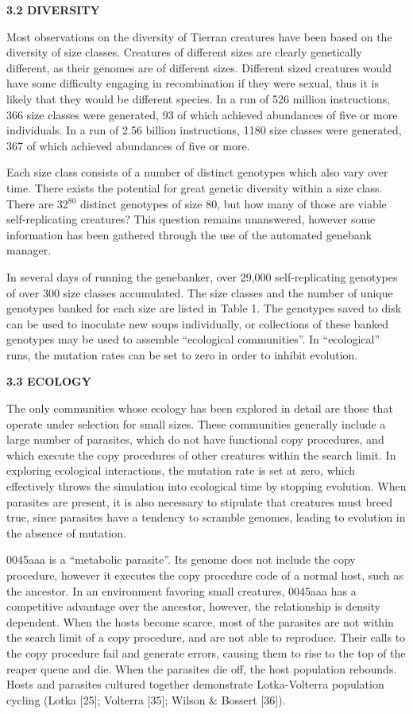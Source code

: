 \LP
\bf 3.2 DIVERSITY\rm
\eLP

Most observations on the diversity of Tierran creatures have been based on
the diversity of size classes.  Creatures of different sizes are clearly
genetically different, as their genomes are of different sizes.  Different
sized creatures would have some difficulty engaging in recombination if they
were sexual, thus it is likely that they would be different species.
In a run of 526 million instructions, 366 size classes were generated, 93
of which achieved abundances of five or more individuals.  In a run of
2.56 billion instructions, 1180 size classes were generated, 367 of which
achieved abundances of five or more.

Each size class consists of a number of distinct genotypes which also vary
over time.  There exists the potential for great genetic diversity within a
size class.  There are 32$^{80}$ distinct genotypes of size 80, but how many
of those are viable self-replicating creatures?  This question remains
unanswered, however some information has been gathered through the use
of the automated genebank manager.

In several days of running the genebanker, over 29,000 self-replicating
genotypes of over 300 size classes accumulated.  The size classes and
the number of unique genotypes banked for each size are listed in Table 1.
The genotypes saved to disk can be used to inoculate new soups individually,
or collections of these banked genotypes may be used to assemble ``ecological
communities''.  In ``ecological'' runs, the mutation rates can be set to zero
in order to inhibit evolution.

\LP
\bf 3.3 ECOLOGY\rm
\eLP

The only communities whose ecology has been explored in detail are those
that operate under selection for small sizes.  These communities generally
include a large number of parasites, which do not have functional copy
procedures, and which execute the copy procedures of other creatures within
the search limit.  In exploring ecological interactions, the mutation rate
is set at zero, which effectively throws the simulation into ecological time
by stopping evolution.  When parasites are present, it is also necessary
to stipulate that creatures must breed true, since parasites have a tendency
to scramble genomes, leading to evolution in the absence of mutation.

0045aaa is a ``metabolic parasite''.  Its genome does not include the
copy procedure, however it executes the copy procedure code of
a normal host, such as the ancestor.  In an environment favoring small
creatures, 0045aaa has a competitive advantage over the ancestor, however, the
relationship is density dependent.  When the hosts become scarce, most of
the parasites are not within the search limit of a copy procedure, and are
not able to reproduce.  Their calls to the copy procedure fail and generate
errors, causing them to rise to the top of the reaper queue and die.
When the parasites die off, the host population rebounds.  Hosts and parasites
cultured together demonstrate Lotka-Volterra population cycling (Lotka [25];
Volterra [35]; Wilson \& Bossert [36]).


